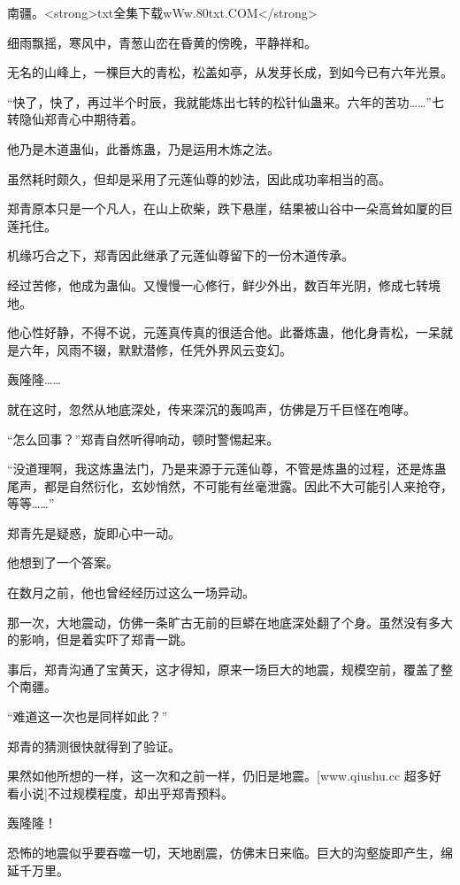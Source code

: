 
\begin{this_body}

南疆。<strong>txt全集下载wWw.80txt.COM</strong>

细雨飘摇，寒风中，青葱山峦在昏黄的傍晚，平静祥和。

无名的山峰上，一棵巨大的青松，松盖如亭，从发芽长成，到如今已有六年光景。

“快了，快了，再过半个时辰，我就能炼出七转的松针仙蛊来。六年的苦功……”七转隐仙郑青心中期待着。

他乃是木道蛊仙，此番炼蛊，乃是运用木炼之法。

虽然耗时颇久，但却是采用了元莲仙尊的妙法，因此成功率相当的高。

郑青原本只是一个凡人，在山上砍柴，跌下悬崖，结果被山谷中一朵高耸如厦的巨莲托住。

机缘巧合之下，郑青因此继承了元莲仙尊留下的一份木道传承。

经过苦修，他成为蛊仙。又慢慢一心修行，鲜少外出，数百年光阴，修成七转境地。

他心性好静，不得不说，元莲真传真的很适合他。此番炼蛊，他化身青松，一呆就是六年，风雨不辍，默默潜修，任凭外界风云变幻。

轰隆隆……

就在这时，忽然从地底深处，传来深沉的轰鸣声，仿佛是万千巨怪在咆哮。

“怎么回事？”郑青自然听得响动，顿时警惕起来。

“没道理啊，我这炼蛊法门，乃是来源于元莲仙尊，不管是炼蛊的过程，还是炼蛊尾声，都是自然衍化，玄妙悄然，不可能有丝毫泄露。因此不大可能引人来抢夺，等等……”

郑青先是疑惑，旋即心中一动。

他想到了一个答案。

在数月之前，他也曾经经历过这么一场异动。

那一次，大地震动，仿佛一条旷古无前的巨蟒在地底深处翻了个身。虽然没有多大的影响，但是着实吓了郑青一跳。

事后，郑青沟通了宝黄天，这才得知，原来一场巨大的地震，规模空前，覆盖了整个南疆。

“难道这一次也是同样如此？”

郑青的猜测很快就得到了验证。

果然如他所想的一样，这一次和之前一样，仍旧是地震。[www.qiushu.cc 超多好看小说]不过规模程度，却出乎郑青预料。

轰隆隆！

恐怖的地震似乎要吞噬一切，天地剧震，仿佛末日来临。巨大的沟壑旋即产生，绵延千万里。


\end{this_body}
